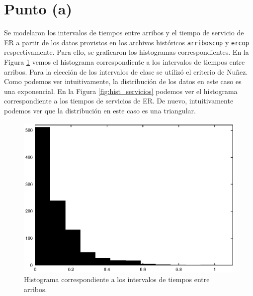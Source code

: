 \documentclass[a4paper,10pt]{article}
\begin{document}


\section{Punto (a)}
Se modelaron los intervalos de tiempos entre arribos y el tiempo de servicio de ER a partir de los datos provistos en los archivos históricos \verb|arriboscop| y \verb|ercop| respectivamente. Para ello, se graficaron los histogramas correspondientes. En la Figura \ref{fig:hist_arriboscop} vemos el histograma correspondiente a los intervalos de tiempos entre arribos. Para la elección de los intervalos de clase se utilizó el criterio de Nuñez. Como podemos ver intuitivamente, la distribución de los datos en este caso es una exponencial. En la Figura \ref{fig:hist_servicios} podemos ver el histograma correspondiente a los tiempos de servicios de ER. De nuevo, intuitivamente podemos ver que la distribución en este caso es una triangular.

\begin{figure}[h]
\begin{center}
\includegraphics[width=12cm]{../src/parteA/hist_arribos.eps}
\caption{\label{fig:hist_arriboscop} Histograma correspondiente a los intervalos de tiempos entre arribos.}
\end{center}
\end{figure}
\end{document}

